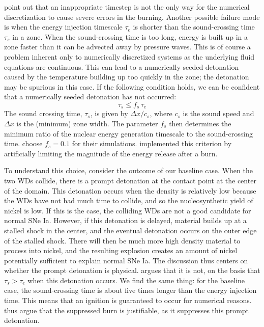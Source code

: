 \documentclass[twocolumn,numberedappendix]{../aastex62}
\begin{document}
\citet{kushnir:2013} point out that an inappropriate timestep is 
not the only way for the numerical discretization to cause 
severe errors in the burning. Another possible failure mode is when
the energy injection timescale
$\tau_e$ is shorter than the sound-crossing time $\tau_s$ in a zone.
When the sound-crossing time is too long, energy is built up in
a zone faster than it can be advected away by pressure waves.
This is of course a problem inherent only to numerically discretized
systems as the underlying fluid equations are continuous.
This can lead to a numerically seeded detonation caused by the
temperature building up too quickly in the zone; the detonation
may be spurious in this case. If the following condition holds,
we can be confident that a numerically seeded detonation has not occurred:
\begin{equation}
  \tau_s \leq f_{s}\, \tau_e \label{eq:burning_limiter_2}
\end{equation}
The sound crossing time, $\tau_s$, is given by $\Delta x / c_s$, 
where $c_s$ is the sound speed and $\Delta x$ is the (minimum) 
zone width. The parameter $f_{s}$ then determines the minimum
ratio of the nuclear energy generation timescale to the 
sound-crossing time. \citet{kushnir:2013} choose $f_{s} = 0.1$ 
for their simulations. \citet{kushnir:2013} implemented this
criterion by artificially limiting the magnitude of the energy
release after a burn.

To understand this choice, consider the outcome of our baseline case.
When the two WDs collide, there is a prompt detonation
at the contact point at the center of the domain. This detonation occurs
when the density is relatively low because the WDs have not had much
time to collide, and so the nucleosynthetic yield of nickel is low. If
this is the case, the colliding WDs are not a good candidate for
normal SNe Ia. However, if this detonation is delayed, material builds
up at a stalled shock in the center, and the eventual detonation occurs
on the outer edge of the stalled shock. There will then be much more
high density material to process into nickel, and the resulting
explosion creates an amount of nickel potentially sufficient to explain
normal SNe Ia. The discussion thus centers on whether the prompt detonation
is physical. \citeauthor{kushnir:2013} argues that it is not, on the basis
that $\tau_s > \tau_e$ when this detonation occurs. We find the same thing:
for the baseline case, the sound-crossing time is about five times longer
than the energy injection time. This means that an ignition is guaranteed
to occur for numerical reasons. \citeauthor{kushnir:2013} thus argue that
the suppressed burn is justifiable, as it suppresses this prompt detonation.
\end{document}
